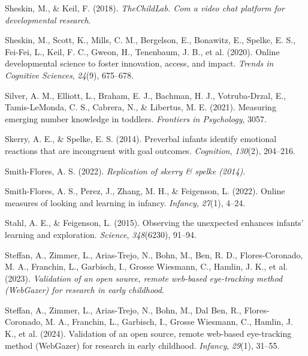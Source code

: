 \documentclass[
  man,floatsintext]{apa6}
\newlength{\cslhangindent}
\newlength{\cslentryspacingunit} %
\newenvironment{CSLReferences}[2] %
 {%
  \setlength{\parindent}{0pt}
  \ifodd #1
  \let\oldpar\par
  \def\par{\hangindent=\cslhangindent\oldpar}
  \fi
  \setlength{\parskip}{#2\cslentryspacingunit}
 }%
 {}
\begin{document}
\begin{CSLReferences}{1}{0}
\leavevmode{}%
Sheskin, M., \& Keil, F. (2018). \emph{TheChildLab. Com a video chat platform for developmental research}.

\leavevmode{}%
Sheskin, M., Scott, K., Mills, C. M., Bergelson, E., Bonawitz, E., Spelke, E. S., Fei-Fei, L., Keil, F. C., Gweon, H., Tenenbaum, J. B., et al. (2020). Online developmental science to foster innovation, access, and impact. \emph{Trends in Cognitive Sciences}, \emph{24}(9), 675--678.

\leavevmode{}%
Silver, A. M., Elliott, L., Braham, E. J., Bachman, H. J., Votruba-Drzal, E., Tamis-LeMonda, C. S., Cabrera, N., \& Libertus, M. E. (2021). Measuring emerging number knowledge in toddlers. \emph{Frontiers in Psychology}, 3057.

\leavevmode{}%
Skerry, A. E., \& Spelke, E. S. (2014). Preverbal infants identify emotional reactions that are incongruent with goal outcomes. \emph{Cognition}, \emph{130}(2), 204--216.

\leavevmode{}%
Smith-Flores, A. S. (2022). \emph{Replication of skerry \& spelke (2014)}.

\leavevmode{}%
Smith-Flores, A. S., Perez, J., Zhang, M. H., \& Feigenson, L. (2022). Online measures of looking and learning in infancy. \emph{Infancy}, \emph{27}(1), 4--24.

\leavevmode{}%
Stahl, A. E., \& Feigenson, L. (2015). Observing the unexpected enhances infants' learning and exploration. \emph{Science}, \emph{348}(6230), 91--94.

\leavevmode{}%
Steffan, A., Zimmer, L., Arias-Trejo, N., Bohn, M., Ben, R. D., Flores-Coronado, M. A., Franchin, L., Garbisch, I., Grosse Wiesmann, C., Hamlin, J. K., et al. (2023). \emph{Validation of an open source, remote web-based eye-tracking method (WebGazer) for research in early childhood}.

\leavevmode{}%
Steffan, A., Zimmer, L., Arias-Trejo, N., Bohn, M., Dal Ben, R., Flores-Coronado, M. A., Franchin, L., Garbisch, I., Grosse Wiesmann, C., Hamlin, J. K., et al. (2024). Validation of an open source, remote web-based eye-tracking method (WebGazer) for research in early childhood. \emph{Infancy}, \emph{29}(1), 31--55.


\end{CSLReferences}
\end{document}
